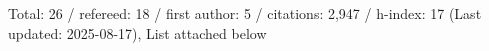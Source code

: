 Total: 26 / refereed: 18 / first author: 5 / citations: 2,947 / h-index: 17 (Last updated: 2025-08-17), List attached below